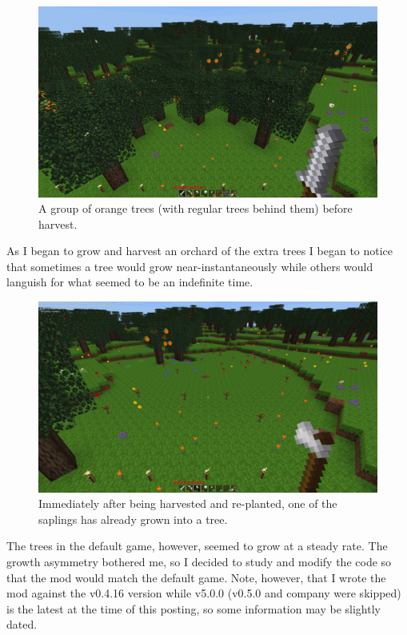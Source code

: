 \documentclass{article}
\begin{document}
\begin{figure}
\includegraphics[scale=0.33]{files/blog/2019_03_31_tree_growth_in_minetest/2019_03_31_orange_trees.png}
\caption{A group of orange trees (with regular trees behind them) before harvest.}
\end{figure}

As I began to grow and harvest an orchard of the extra trees I began to notice that sometimes a tree would grow near-instantaneously while others would languish for what seemed to be an indefinite time.

\begin{figure}
\includegraphics[scale=0.33]{files/blog/2019_03_31_tree_growth_in_minetest/2019_03_31_harvested.png}
\caption{Immediately after being harvested and re-planted, one of the saplings has already grown into a tree.}
\end{figure}

The trees in the default game, however, seemed to grow at a steady rate.  The growth asymmetry bothered me, so I decided to study and modify the code so that the mod would match the default game.  Note, however, that I wrote the mod against the v0.4.16 version while v5.0.0 (v0.5.0 and company were skipped) is the latest at the time of this posting, so some information may be slightly dated.
\end{document}
